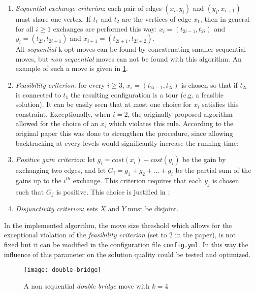 \begin{enumerate}
	\item \emph{Sequential exchange criterion}: each pair of edges $(x_i, y_i)$ and $(y_i, x_{i+1})$ must share one vertex. If $t_1$ and $t_2$ are the vertices of edge $x_1$, then in general for all $i \ge 1$ exchanges are performed this way: $x_i=(t_{2i-1}, t_{2i})$ and $y_i=(t_{2i}, t_{2i+1})$ and $x_{i+1}=(t_{2i+1}, t_{2i+2})$.\\ All \emph{sequential} k-opt moves can be found by concatenating smaller sequential moves, but \emph{non sequential} moves can not be found with this algorithm. An example of such a move is given in \cref{fig:doublebridge}.
	\item \emph{Feasibility criterion}: for every $i \ge 3$, $x_i=(t_{2i-1}, t_{2i})$ is chosen so that if $t_{2i}$ is connected to $t_1$ the resulting configuration is a tour (e.g. a feasible solution). It can be easily seen that at most one choice for $x_i$ satisfies this constraint. Exceptionally, when $i=2$, the originally proposed algorithm allowed for the choice of an $x_i$ which violates this rule. According to the original paper this was done to strengthen the procedure, since allowing backtracking at every levels would significantly increase the running time;
	\item \emph{Positive gain criterion}: let $g_i=cost(x_i) - cost(y_i)$ be the gain by exchanging two edges, and let $G_i=g_1+g_2+...+g_i$ be the partial sum of the gains up to the $i^{th}$ exchange. This criterion requires that each $y_j$ is chosen such that $G_j$ is positive. This choice is justified in \cite{Helsgaun2000};
	\item \emph{Disjunctivity criterion}: sets $X$ and $Y$ must be disjoint.
\end{enumerate}
In the implemented algorithm, the move size threshold which allows for the exceptional violation of the \emph{feasibility criterion} (set to $2$ in the paper), is not fixed but it can be modified in the configuration file \texttt{config.yml}. In this way the influence of this parameter on the solution quality could be tested and optimized.

\begin{figure}[]
	\centering
	\texttt{[image: double-bridge]}
	\caption{A non sequential \emph{double bridge} move with $k=4$}
	\label{fig:doublebridge}
\end{figure}

